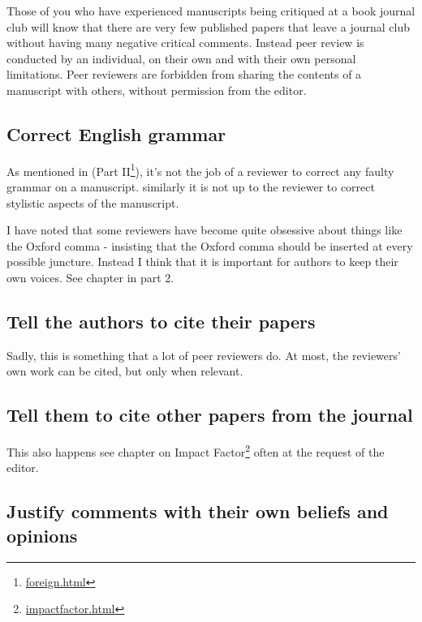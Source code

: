 \documentclass[
]{krantz}
\renewcommand{\href}[2]{#2\footnote{\url{#1}}}
\begin{document}
Those of you who have experienced manuscripts being critiqued at a book journal club will know that there are very few published papers that leave a journal club without having many negative critical comments. Instead peer review is conducted by an individual, on their own and with their own personal limitations. Peer reviewers are forbidden from sharing the contents of a manuscript with others, without permission from the editor.

\hypertarget{correct-english-grammar}{%
\subsection{Correct English grammar}\label{correct-english-grammar}}

As mentioned in (\href{foreign.html}{Part II}), it's not the job of a reviewer to correct any faulty grammar on a manuscript. similarly it is not up to the reviewer to correct stylistic aspects of the manuscript.

I have noted that some reviewers have become quite obsessive about things like the Oxford comma - insisting that the Oxford comma should be inserted at every possible juncture. Instead I think that it is important for authors to keep their own voices. See chapter in part 2.

\hypertarget{tell-the-authors-to-cite-their-papers}{%
\subsection{Tell the authors to cite their papers}\label{tell-the-authors-to-cite-their-papers}}

Sadly, this is something that a lot of peer reviewers do. At most, the reviewers' own work can be cited, but only when relevant.

\hypertarget{tell-them-to-cite-other-papers-from-the-journal}{%
\subsection{Tell them to cite other papers from the journal}\label{tell-them-to-cite-other-papers-from-the-journal}}

This also happens \href{impactfactor.html}{see chapter on Impact Factor} often at the request of the editor.

\hypertarget{justify-comments-with-their-own-beliefs-and-opinions}{%
\subsection{Justify comments with their own beliefs and opinions}\label{justify-comments-with-their-own-beliefs-and-opinions}}
\end{document}
